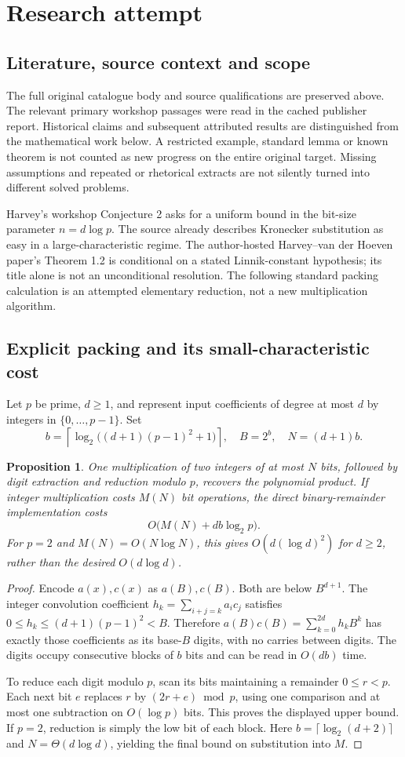 \documentclass[11pt]{article}
\newtheorem{proposition}{Proposition}
\begin{document}
\section{Research attempt}
\subsection{Literature, source context and scope}
The full original catalogue body and source qualifications are preserved above. The relevant primary workshop passages were read in the cached publisher report. Historical claims and subsequent attributed results are distinguished from the mathematical work below. A restricted example, standard lemma or known theorem is not counted as new progress on the entire original target. Missing assumptions and repeated or rhetorical extracts are not silently turned into different solved problems.

Harvey's workshop Conjecture 2 asks for a uniform bound in the bit-size parameter $n=d\log p$. The source already describes Kronecker substitution as easy in a large-characteristic regime. The author-hosted Harvey--van der Hoeven paper's Theorem 1.2 is conditional on a stated Linnik-constant hypothesis; its title alone is not an unconditional resolution. The following standard packing calculation is an attempted elementary reduction, not a new multiplication algorithm.
\subsection{Explicit packing and its small-characteristic cost}
Let $p$ be prime, $d\ge1$, and represent input coefficients of degree at most $d$ by integers in $\{0,\ldots,p-1\}$. Set
\[
 b=\left\lceil\log_2\big((d+1)(p-1)^2+1\big)\right\rceil,
 \quad B=2^b,\quad N=(d+1)b.
\]
\begin{proposition}
One multiplication of two integers of at most $N$ bits, followed by digit extraction and reduction modulo $p$, recovers the polynomial product. If integer multiplication costs $M(N)$ bit operations, the direct binary-remainder implementation costs
\[
 O\big(M(N)+db\log_2 p\big).
\]
For $p=2$ and $M(N)=O(N\log N)$, this gives $O(d(\log d)^2)$ for $d\ge2$, rather than the desired $O(d\log d)$.
\end{proposition}
\begin{proof}
Encode $a(x),c(x)$ as $a(B),c(B)$. Both are below $B^{d+1}$. The integer convolution coefficient $h_k=\sum_{i+j=k}a_ic_j$ satisfies $0\le h_k\le(d+1)(p-1)^2<B$. Therefore $a(B)c(B)=\sum_{k=0}^{2d}h_kB^k$ has exactly those coefficients as its base-$B$ digits, with no carries between digits. The digits occupy consecutive blocks of $b$ bits and can be read in $O(db)$ time.

To reduce each digit modulo $p$, scan its bits maintaining a remainder $0\le r<p$. Each next bit $e$ replaces $r$ by $(2r+e)\bmod p$, using one comparison and at most one subtraction on $O(\log p)$ bits. This proves the displayed upper bound. If $p=2$, reduction is simply the low bit of each block. Here $b=\lceil\log_2(d+2)\rceil$ and $N=\Theta(d\log d)$, yielding the final bound on substitution into $M$.
\end{proof}
\end{document}
